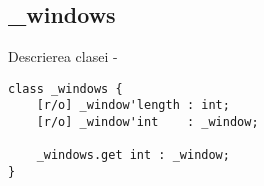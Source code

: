\subsection{{\color{orange} \_windows}}

\noindent Descrierea clasei  -
\begin{lstlisting}[numbers=none]
class _windows {
	[r/o] _window'length : int;
	[r/o] _window'int    : _window;
	
	_windows.get int : _window;
}
\end{lstlisting}


